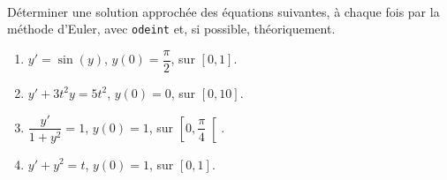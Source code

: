 \exer{[EQD-004]}
\setcounter{numques}{0}~\\

 
\question{} Déterminer une solution approchée des équations suivantes, à chaque fois par la méthode d'Euler, avec \texttt{odeint} et, si possible, théoriquement.
  \begin{enumerate}
    \item $y' = \sin(y)$, $y(0) = \dfrac{\pi}{2}$, sur $[0,1]$.
    \item $y' + 3t^2 y = 5t^2$, $y(0) = 0$, sur $[0,10]$.
    \item $\dfrac{y'}{1+y^2} = 1$, $y(0) = 1$, sur $\left[0,\dfrac{\pi}{4} \right[$.
    \item $y'+y^2=t$, $y(0) = 1$, sur $[0,1]$.
  \end{enumerate}